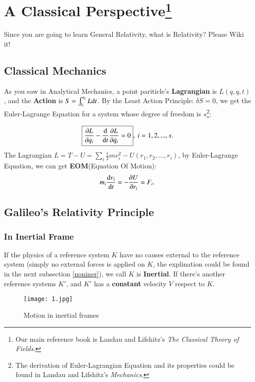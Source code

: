 \documentclass[openany,10pt]{book}
\theoremstyle{definition}
\theoremstyle{definition}
\theoremstyle{remark}
\begin{document}
\chapter[A Classical Perspective]{A Classical Perspective\footnote{Our main reference book is Landau and Lifshitz's \textit{The Classical Theory of Fields}.}}\label{pre} 

Since you are going to learn General Relativity, what is Relativity? Please Wiki it!

\section{Classical Mechanics}
As you saw in Analytical Mechanics, a point pariticle's {\bfseries Lagrangian} is $L(q,\dot q,t)$, and the \textbf{Action} is $S=\int^{t_2}_{t_1}L {\rm d}t $.
By the Least Action Principle: $\delta S=0$, we get the Euler-Lagrange Equation for a system whose degree of freedom is $s$\footnote{The derivation of Euler-Lagrangian Equation and its properties could be found in Landau and Lifshitz's \textit{Mechanics}.}:

\begin{equation}\label{1}
\boxed{\frac{\partial L}{\partial q_i}-\frac{\rm{d}}{{\rm d}t}\frac{\partial L}{\partial \dot q_i}=0},\ i=1,2,...,s.
\end{equation}
The Lagrangian $L=T-U=\sum_i \frac12 mv_i^2-U(r_1,r_2, \dots ,r_i)$, by Euler-Lagrange Equation, we can get \textbf{EOM}(Equation Of Motion):
\begin{equation}
m_i \frac{{\rm d}v_i}{{\rm d}t}=-\frac{\partial U}{\partial r_i}=F_i.
\end{equation}


\section{Galileo's Relativity Principle}
\subsection{In Inertial Frame}
If the physics of a reference system $K$ have no causes external to the reference system (simply no external forces is applied on $K$, the explination could be found in the next subsection \ref{noniner}), we call $K$ is {\bfseries Inertial}. If there's another reference systems $K'$, and $K'$ has a {\bfseries constant} velocity $V$ respect to $K$.

\begin{figure}[htbp]

  \centering
    \texttt{[image: 1.jpg]}
 \caption{Motion in inertial frames}
\end{figure}
\end{document}
